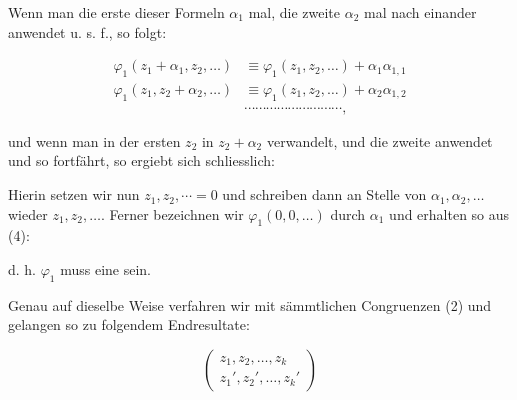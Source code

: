 Wenn man die erste dieser Formeln $\alpha_1$ mal, die zweite $\alpha_2$ mal
nach einander anwendet u. s. f., so folgt:

\[
\begin{aligned}
\varphi_1(z_1+\alpha_1, z_2, \dots) &\equiv \varphi_1(z_1, z_2, \dots) + \alpha_1\alpha_{1,1} \\
\varphi_1(z_1, z_2+\alpha_2, \dots) &\equiv \varphi_1(z_1, z_2, \dots) + \alpha_2\alpha_{1,2} \\
&\cdots\cdots\cdots\cdots\cdots\cdots\cdots\cdots\cdots,
\end{aligned}
\]

und wenn man in der ersten $z_2$ in $z_2+\alpha_2$ verwandelt, und die
zweite anwendet und so fortfährt, so ergiebt sich schliesslich:


Hierin setzen wir nun $z_1, z_2, \cdots = 0$ und schreiben dann an Stelle von
$\alpha_1, \alpha_2, \dots$ wieder $z_1, z_2, \dots$. Ferner bezeichnen
wir $\varphi_1(0, 0, \dots)$ durch $\alpha_1$ und erhalten so aus (4):


d. h. $\varphi_1$ muss eine  sein.

Genau auf dieselbe Weise verfahren wir mit sämmtlichen Congruenzen (2) und gelangen so zu folgendem Endresultate:


\[
\begin{pmatrix} z_1, z_2, \dots, z_k \\ z_1', z_2', \dots, z_k' \end{pmatrix}
\]



